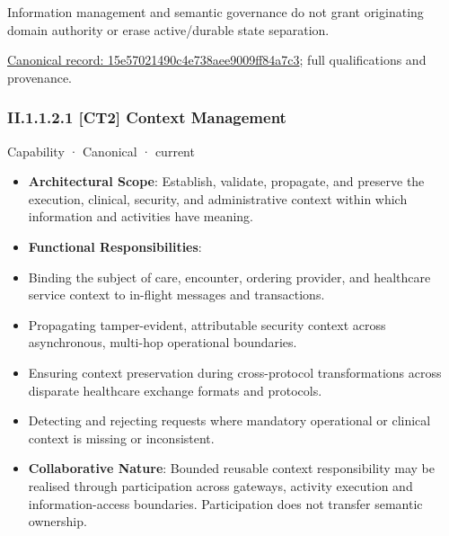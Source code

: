 Information management and semantic governance do not grant originating domain authority or erase active/durable state separation.


{\footnotesize \href{../../../../../../../continuum/strategy/capability/15e57021490c4e738aee9009ff84a7c3.md}{Canonical record: 15e57021490c4e738aee9009ff84a7c3}; full qualifications and provenance.}\par
\subsubsection*{II.1.1.2.1 [CT2] Context Management}
\label{navigation:II.1.1.2.1}

\label{element:3cfd3e56c23a4943bd1b476ec248ac49}
{\small Capability · Canonical · current}\par

\begin{itemize}


\item \textbf{Architectural Scope}: Establish, validate, propagate, and preserve the execution, clinical, security, and administrative context within which information and activities have meaning.

\item \textbf{Functional Responsibilities}:

\item Binding the subject of care, encounter, ordering provider, and healthcare service context to in-flight messages and transactions.

\item Propagating tamper-evident, attributable security context across asynchronous, multi-hop operational boundaries.

\item Ensuring context preservation during cross-protocol transformations across disparate healthcare exchange formats and protocols.

\item Detecting and rejecting requests where mandatory operational or clinical context is missing or inconsistent.

\item \textbf{Collaborative Nature}: Bounded reusable context responsibility may be realised through participation across gateways, activity execution and information-access boundaries. Participation does not transfer semantic ownership.

\end{itemize}


